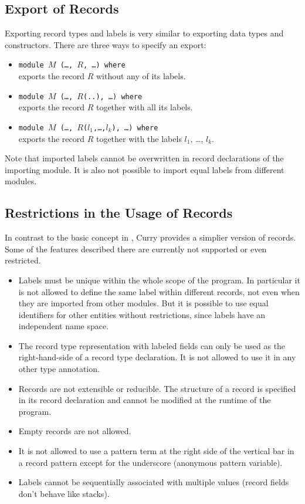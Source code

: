 \documentclass[11pt,fleqn]{article}
\newcommand{\pr}[1]{\mbox{\tt #1}}   %
\begin{document}
\subsection{Export of Records}
\label{sec-exprecs}

Exporting record types and labels is very similar to exporting
data types and constructors. There are three ways 
to specify an export:
\begin{itemize}
\item \pr{module $M$ (\ldots, $R$, \ldots) where} \\
  exports the record $R$ without any of its labels.
\item \pr{module $M$ (\ldots, $R$(..), \ldots) where} \\
  exports the record $R$ together with all its labels.
\item \pr{module $M$ (\ldots, $R$($l_1$,\ldots,$l_k$), \ldots) where} \\
  exports the record $R$ together with the labels $l_1$, \ldots, $l_k$.
\end{itemize}

Note that imported labels cannot be overwritten in record declarations
of the importing module. It is also not possible to import equal labels
from different modules.


\subsection{Restrictions in the Usage of Records}
\label{sec-restrinrecs}

In contrast to the basic concept in \cite{Leijen05}, Curry provides a
simplier version of records. Some of the features described there are
currently not supported or even restricted.

\begin{itemize}
\item Labels must be unique within the whole scope of the program.
  In particular it is not allowed to define the same label within
  different records, not even when they are imported from other
  modules. But it is possible to use equal identifiers for other
  entities without restrictions, since labels have an independent 
  name space.
\item The record type representation with labeled fields can only be
  used as the right-hand-side of a record type declaration. It is
  not allowed to use it in any other type annotation.
\item Records are not extensible or reducible. The structure of a
  record is specified in its record declaration and cannot be
  modified at the runtime of the program.
\item Empty records are not allowed.
\item It is not allowed  to use a pattern term
  at the right side of the vertical bar in a record pattern
  except for the underscore (anonymous pattern variable).
\item Labels cannot be sequentially associated with multiple values
  (record fields don't behave like stacks).
\end{itemize}



\end{document}
